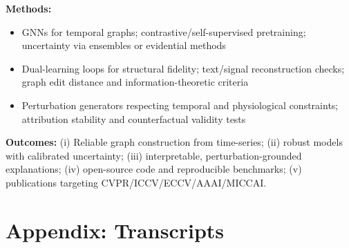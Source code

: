 \documentclass[11pt]{article}
\begin{document}
\textbf{Methods:}
\begin{itemize}[leftmargin=*]
    \item GNNs for temporal graphs; contrastive/self-supervised pretraining; uncertainty via ensembles or evidential methods
    \item Dual-learning loops for structural fidelity; text/signal reconstruction checks; graph edit distance and information-theoretic criteria
    \item Perturbation generators respecting temporal and physiological constraints; attribution stability and counterfactual validity tests
\end{itemize}

\textbf{Outcomes:} (i) Reliable graph construction from time-series; (ii) robust models with calibrated uncertainty; (iii) interpretable, perturbation-grounded explanations; (iv) open-source code and reproducible benchmarks; (v) publications targeting CVPR/ICCV/ECCV/AAAI/MICCAI.

\clearpage
\section*{Appendix: Transcripts}

\end{document}
